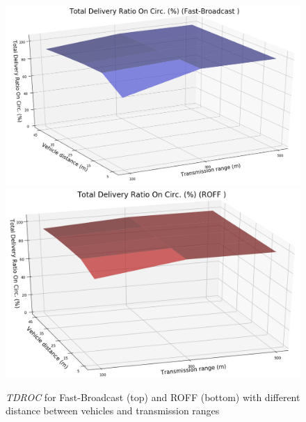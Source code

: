 		\begin{figure}[H]
			\centering
			\includegraphics[width=1.0\textwidth]{immagini/density/fb/tdroc}
			\includegraphics[width=1.0\textwidth]{immagini/density/roff/tdroc}
			\caption{\textit{TDROC} for Fast-Broadcast (top) and ROFF (bottom) with different distance between vehicles and transmission ranges}
			\label{fig:density-tdroc}
		\end{figure}
	
